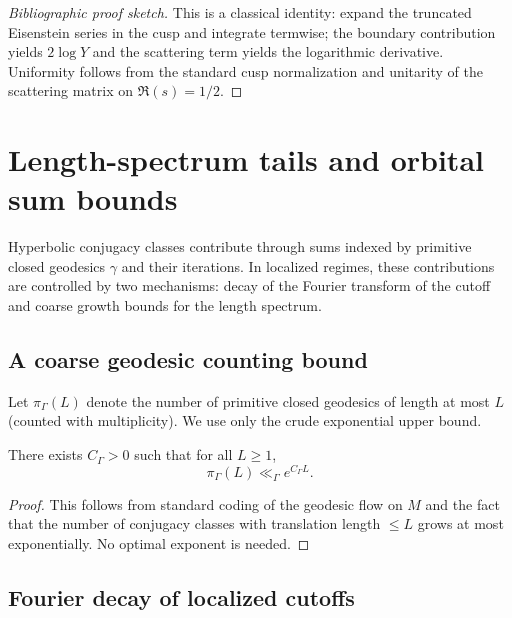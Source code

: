\begin{proof}[Bibliographic proof sketch]
This is a classical identity: expand the truncated Eisenstein series in the cusp and integrate termwise; the boundary
contribution yields $2\log Y$ and the scattering term yields the logarithmic derivative.
Uniformity follows from the standard cusp normalization and unitarity of the scattering matrix on $\Re(s)=1/2$.
\end{proof}

\section{Length-spectrum tails and orbital sum bounds}
\label{sec:B.length-spectrum}

Hyperbolic conjugacy classes contribute through sums indexed by primitive closed geodesics $\gamma$ and their
iterations.  In localized regimes, these contributions are controlled by two mechanisms: decay of the Fourier
transform of the cutoff and coarse growth bounds for the length spectrum.

\subsection{A coarse geodesic counting bound}
\label{subsec:B.geodesic-count}

Let $\pi_\Gamma(L)$ denote the number of primitive closed geodesics of length at most $L$ (counted with multiplicity).
We use only the crude exponential upper bound.

\begin{lemma}
\label{lem:B.geodesic-growth}
There exists $C_\Gamma>0$ such that for all $L\ge 1$,
\begin{equation}
\label{eq:B.geodesic-growth}
\pi_\Gamma(L)\ll_\Gamma e^{C_\Gamma L}.
\end{equation}
\end{lemma}

\begin{proof}
This follows from standard coding of the geodesic flow on $M$ and the fact that the number of conjugacy classes with
translation length $\le L$ grows at most exponentially.  No optimal exponent is needed.
\end{proof}

\subsection{Fourier decay of localized cutoffs}
\label{subsec:B.fourier-decay}

